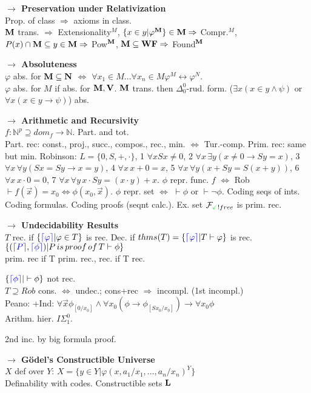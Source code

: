 \documentclass[9pt]{article}
\newcommand{\class}[1]{{\bf #1}}
\newcommand{\N}{\mathbb{N}}
\newcommand{\code}[1]{{\color{blue}\lceil#1\rceil}}
\newcommand{\mytitle}[1]{ {\bf $\rightarrow$ #1}\\}
\newcommand{\V}{\class{V}}
\newcommand{\M}{\class{M}}
\newcommand{\WF}{\class{WF}}
\begin{document}
\begin{multicols*}{2}
\mytitle{Preservation under Relativization}
Prop. of class $\Rightarrow$ axioms in class.\\
$\class{M}$ trans. $\Rightarrow$ Extensionality$^M$, $\{x\in y|\varphi^\M\}\in\M\Rightarrow$ Compr.$^M$, $P(x)\cap\M\subseteq y\in \M\Rightarrow$ Pow$^\M$, $\M\subseteq \WF\Rightarrow$ Found$^\M$

\mytitle{Absoluteness}
$\varphi$ abs. for $\class{M}\subseteq\class{N}$ $\Leftrightarrow$ $\forall x_1\in M...\forall x_n\in M \varphi^M\leftrightarrow\varphi^N$.\\
$\varphi$ abs. for $M$ if abs. for $\class{M}, \V$.
$\class{M}$ trans. then $\Delta_0^0$-rud. form. ($\exists x(x\in y\wedge\psi)$ or $\forall x(x\in y\to\psi)$) abs.

\mytitle{Arithmetic and Recursivity}
$f\colon \N^p\supseteq dom_f\to \N$. Part. and tot.\\
Part. rec: const., proj., succ., compos., rec., min. $\Leftrightarrow$ Tur.-comp. Prim. rec: same but min.
Robinson: $L=\{0,S,+,\cdot\}$, 1 $\forall x Sx\neq 0$, 2 $\forall x\,\exists y (x\neq 0\to Sy=x)$, 3 $\forall x \,\forall y (Sx=Sy\to x=y)$, 4 $\forall x\,x+0=x$, 5 $\forall x\,\forall y (x+Sy=S(x+y))$, 6 $\forall x\,x\cdot 0=0$, 7 $\forall x\,\forall y\,x\cdot Sy=(x\cdot y)+x$.
$\phi$ repr. func. $f$ $\Leftrightarrow$ Rob$\vdash f(\vec{x})=x_0\Leftrightarrow\phi(x_0,\vec{x})$. $\phi$ repr. set $\Leftrightarrow$ $\vdash\phi$ or $\vdash\neg\phi$. Coding seqs of ints. Coding formulas. Coding proofs (seqnt calc.). Ex. set $\mathcal{F}_{{\color{green}\checkmark}!free}$ is prim. rec.

\mytitle{Undecidability Results}
$T$ rec. if $\{\code{\varphi}|\varphi\in T\}$ is rec. Dec. if $thms(T)=\{\code{\varphi}|T\vdash\varphi\}$ is rec.\\
$\{(\code{P},\code{\phi})|P\,is\,proof\,of\,T\vdash\phi\}$\\
prim. rec if T prim. rec., rec. if T rec.

$\{\code{\phi}|\vdash\phi\}$ not rec.\\
$T\supseteq Rob$ cons. $\Leftrightarrow$ undec.; cons+rec $\Rightarrow$ incompl. (1st incompl.)\\
Peano: +Ind: $\forall \vec{x}\phi_{[0/x_0]}\wedge\forall x_0(\phi\to \phi_{[Sx_0/x_0]})\to\forall x_0\phi$\\
Arithm. hier. $I\Sigma_1^0$.

2nd inc. by big formula proof.

\mytitle{G\"odel's Constructible Universe}
$X$ def over $Y$: $X=\{y\in Y|\varphi(x,a_1/x_1,...,a_n/x_n)^Y\}$\\
Definability with codes. Constructible sets $\class{L}$


\end{multicols*}
\end{document}
